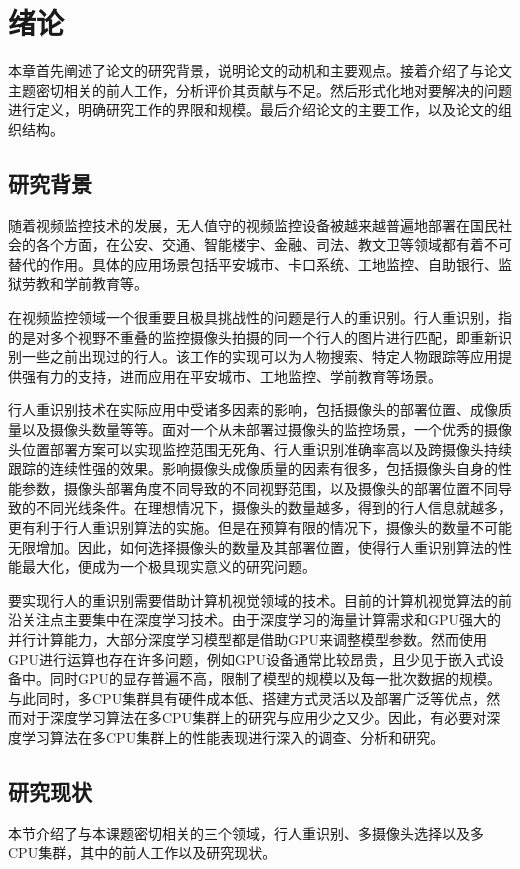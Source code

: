 \chapter{绪论}\label{sec:introduction}

本章首先阐述了论文的研究背景，说明论文的动机和主要观点。接着介绍了与论文主题密切相关的前人工作，分析评价其贡献与不足。然后形式化地对要解决的问题进行定义，明确研究工作的界限和规模。最后介绍论文的主要工作，以及论文的组织结构。

\section{研究背景}

随着视频监控技术的发展，无人值守的视频监控设备被越来越普遍地部署在国民社会的各个方面，在公安、交通、智能楼宇、金融、司法、教文卫等领域都有着不可替代的作用。具体的应用场景包括平安城市、卡口系统、工地监控、自助银行、监狱劳教和学前教育等。

在视频监控领域一个很重要且极具挑战性的问题是行人的重识别。行人重识别，指的是对多个视野不重叠的监控摄像头拍摄的同一个行人的图片进行匹配\cite{chen2018person}，即重新识别一些之前出现过的行人。该工作的实现可以为人物搜索、特定人物跟踪等应用提供强有力的支持，进而应用在平安城市、工地监控、学前教育等场景。

行人重识别技术在实际应用中受诸多因素的影响，包括摄像头的部署位置、成像质量以及摄像头数量等等。面对一个从未部署过摄像头的监控场景，一个优秀的摄像头位置部署方案可以实现监控范围无死角、行人重识别准确率高以及跨摄像头持续跟踪的连续性强的效果。影响摄像头成像质量的因素有很多，包括摄像头自身的性能参数，摄像头部署角度不同导致的不同视野范围，以及摄像头的部署位置不同导致的不同光线条件。在理想情况下，摄像头的数量越多，得到的行人信息就越多，更有利于行人重识别算法的实施。但是在预算有限的情况下，摄像头的数量不可能无限增加。因此，如何选择摄像头的数量及其部署位置，使得行人重识别算法的性能最大化，便成为一个极具现实意义的研究问题。

要实现行人的重识别需要借助计算机视觉领域的技术。目前的计算机视觉算法的前沿关注点主要集中在深度学习技术。由于深度学习的海量计算需求和GPU强大的并行计算能力，大部分深度学习模型都是借助GPU来调整模型参数。然而使用GPU进行运算也存在许多问题，例如GPU设备通常比较昂贵，且少见于嵌入式设备中。同时GPU的显存普遍不高，限制了模型的规模以及每一批次数据的规模。与此同时，多CPU集群具有硬件成本低、搭建方式灵活以及部署广泛等优点，然而对于深度学习算法在多CPU集群上的研究与应用少之又少。因此，有必要对深度学习算法在多CPU集群上的性能表现进行深入的调查、分析和研究。

\section{研究现状}
本节介绍了与本课题密切相关的三个领域，行人重识别、多摄像头选择以及多CPU集群，其中的前人工作以及研究现状。

